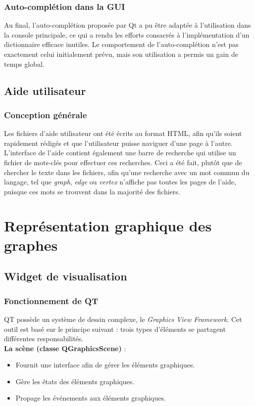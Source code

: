 \documentclass[french]{article}
\begin{document}
	\subsubsection{Auto-complétion dans la GUI}
	Au final, l'auto-complétion proposée par Qt a pu être adaptée à l'utilisation dans la console principale, ce qui a rendu les efforts consacrés à l'implémentation d'un dictionnaire efficace inutiles. Le comportement de l'auto-complétion n'est pas exactement celui initialement prévu, mais son utilisation a permis un gain de temps global.
	
	\subsection{Aide utilisateur}
	\subsubsection{Conception générale}
	Les fichiers d'aide utilisateur ont été écrits au format HTML, afin qu'ils soient rapidement rédigés et que l'utilisateur puisse naviguer d'une page à l'autre. L'interface de l'aide contient également une barre de recherche qui utilise un fichier de mots-clés pour effectuer ces recherches. Ceci a été fait, plutôt que de chercher le texte dans les fichiers, afin qu'une recherche avec un mot commun du langage, tel que \textit{graph}, \textit{edge} ou \textit{vertex} n'affiche pas toutes les pages de l'aide, puisque ces mots se trouvent dans la majorité des fichiers.

	\section{Représentation graphique des graphes}
	\subsection{Widget de visualisation}
	\subsubsection{Fonctionnement de QT}
	QT possède un système de dessin complexe, le \textit{Graphics View Framework}. Cet outil est basé sur le principe suivant : trois types d'éléments se partagent différentes responsabilités. \\
	
	\textbf{La scène (classe QGraphicsScene)} :
	\begin{itemize}
		\item Fournit une interface afin de gérer les éléments graphiques.
		\item Gère les états des éléments graphiques.
		\item Propage les événements aux éléments graphiques.
	\end{itemize}
	
\end{document}
